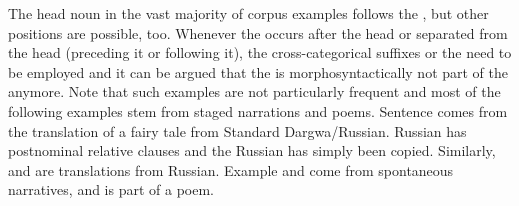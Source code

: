 The head noun in the vast majority of corpus examples follows the , but other positions are possible, too. Whenever the  occurs after the head or separated from the head (preceding it or following it), the cross-categorical suffixes or the  need to be employed and it can be argued that the  is morphosyntactically not part of the  anymore. Note that such examples are not particularly frequent and most of the following examples stem from staged narrations and poems. Sentence  comes from the translation of a fairy tale from Standard Dargwa\slash Russian.  Russian has postnominal relative clauses and the Russian  has simply been copied. Similarly,  and  are translations from Russian. Example  and  come from spontaneous narratives, and  is part of a poem.

